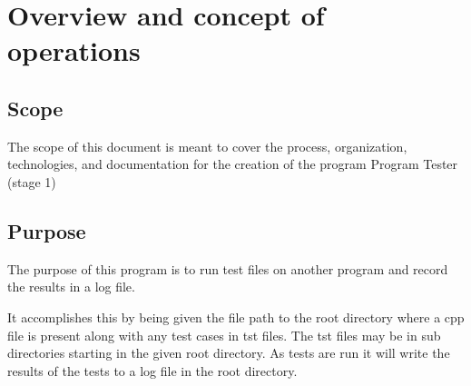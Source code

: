 
\chapter{Overview and concept of operations}



\section{Scope}
The scope of this document is meant to cover the process, organization,
technologies, and documentation for the creation of the program
Program Tester (stage 1)

\section{Purpose}
The purpose of this program is to run test files on another
 program and record the results in a log file.

It accomplishes this by being given the file path
 to the root directory where a cpp file is present
 along with any test cases in tst files. The tst files
 may be in sub directories starting in the given root
 directory. As tests are run it will write the results
 of the tests to a log file in the root directory.





